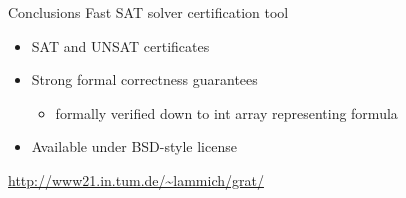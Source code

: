 \documentclass[fleqn]{beamer}
\begin{document}
\begin{frame}{Conclusions}
  Fast SAT solver certification tool
  \begin{itemize}
   \item SAT and UNSAT certificates
   \item Strong formal correctness guarantees
    \begin{itemize}
     \item formally verified down to int array representing formula
    \end{itemize}
   \item Available under BSD-style license
    
  \end{itemize}
  \vfill 
  \center \url{http://www21.in.tum.de/~lammich/grat/}
  
  
    
  
  
  
  
  
  


\end{frame}
\end{document}
